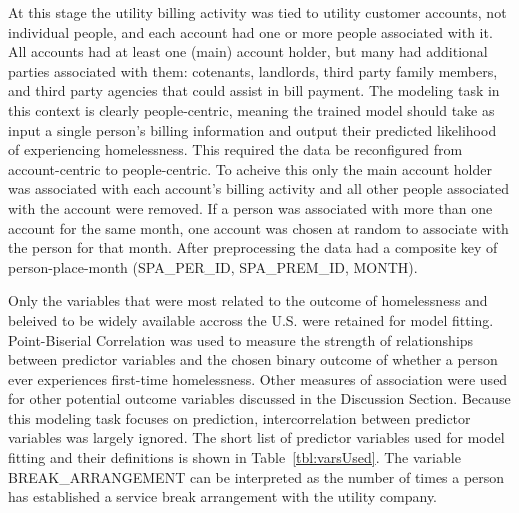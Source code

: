 \documentclass[10pt,letterpaper]{article}
\begin{document}
At this stage the utility billing activity was tied to utility customer accounts, not individual people, and each account had one or more people associated with it. All accounts had at least one (main) account holder, but many had additional parties associated with them: cotenants, landlords, third party family members, and third party agencies that could assist in bill payment. The modeling task in this context is clearly people-centric, meaning the trained model should take as input a single person's billing information and output their predicted likelihood of experiencing homelessness. This required the data be reconfigured from account-centric to people-centric. To acheive this only the main account holder was associated with each account's billing activity and all other people associated with the account were removed. If a person was associated with more than one account for the same month, one account was chosen at random to associate with the person for that month. After preprocessing the data had a composite key of person-place-month (SPA\_PER\_ID, SPA\_PREM\_ID, MONTH).

Only the variables that were most related to the outcome of homelessness and beleived to be widely available accross the U.S. were retained for model fitting. Point-Biserial Correlation was used to measure the strength of relationships between predictor variables and the chosen binary outcome of whether a person ever experiences first-time homelessness. Other measures of association were used for other potential outcome variables discussed in the Discussion Section. Because this modeling task focuses on prediction, intercorrelation between predictor variables was largely ignored. The short list of predictor variables used for model fitting and their definitions is shown in Table~\ref{tbl:varsUsed}. The variable BREAK\_ARRANGEMENT can be interpreted as the number of times a person has established a service break arrangement with the utility company.
\end{document}
